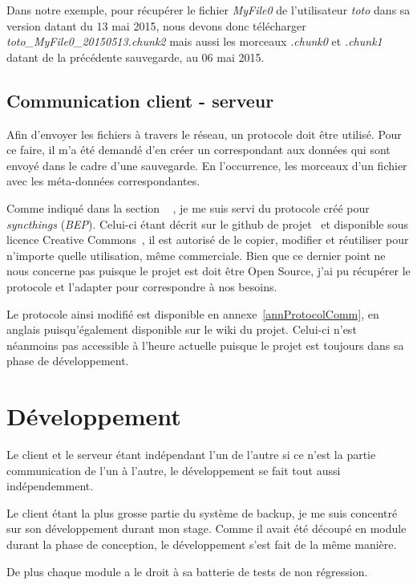 \documentclass[a4paper,10pt, twoside]{report}
\begin{document}
\begin{spacing}{1.2}
Dans notre exemple, pour r\'ecup\'erer le fichier \textit{MyFile0} de
l'utilisateur \textit{toto}  dans sa version datant du 13 mai 2015, nous devons
donc t\'el\'echarger \textit{toto\_MyFile0\_20150513.chunk2} mais aussi les
morceaux \textit{.chunk0} et \textit{.chunk1} datant de la pr\'ec\'edente
sauvegarde, au 06 mai 2015.

\subsection{Communication client - serveur}
Afin d'envoyer les fichiers \`a travers le r\'eseau, un protocole doit \^etre
utilis\'e. Pour ce faire, il m'a \'et\'e demand\'e d'en cr\'eer un correspondant
aux donn\'ees qui sont envoy\'e dans le cadre d'une sauvegarde. En l'occurrence,
les morceaux d'un fichier avec les m\'eta-donn\'ees correspondantes.

Comme indiqu\'e dans la section \flqq~ \frqq, je me
suis servi du protocole cr\'e\'e pour \textit{syncthings} (\textit{BEP}).
Celui-ci \'etant d\'ecrit sur le github de projet~\cite{refBEP} et
disponible sous licence Creative Commons~\cite{refCC4.0}, il est autoris\'e de
le copier, modifier et r\'eutiliser pour n'importe quelle utilisation, m\^eme
commerciale. Bien que ce dernier point ne nous concerne pas puisque le projet
est doit \^etre Open Source, j'ai pu r\'ecup\'erer le protocole et l'adapter
pour correspondre \`a nos besoins.

Le protocole ainsi modifi\'e est disponible en annexe~\ref{annProtocolComm}, en
anglais puisqu'\'egalement disponible sur le wiki du projet. Celui-ci n'est
n\'eanmoins pas accessible \`a l'heure actuelle puisque le projet est toujours
dans sa phase de d\'eveloppement.


\section{D\'eveloppement}
Le client et le serveur \'etant ind\'ependant l'un de l'autre si ce n'est la
partie communication de l'un \`a l'autre, le d\'eveloppement se fait tout
aussi ind\'ependemment.

Le client \'etant la plus grosse partie du syst\`eme de backup, je me suis
concentr\'e sur son d\'eveloppement durant mon stage. Comme il avait \'et\'e
d\'ecoup\'e en module durant la phase de conception, le d\'eveloppement s'est
fait de la m\^eme mani\`ere.

De plus chaque module a le droit \`a sa batterie de tests de non r\'egression.


\end{spacing}
\end{document}
